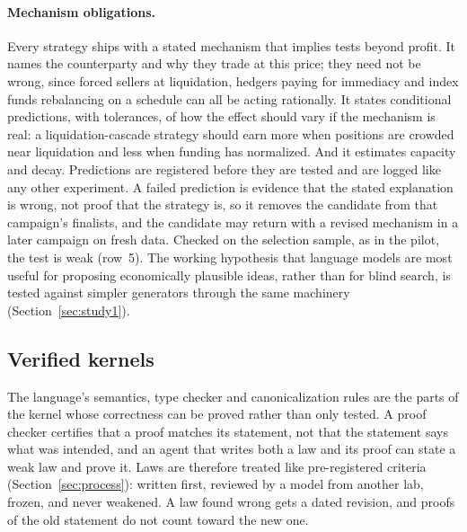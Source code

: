 \documentclass[11pt]{article}
\begin{document}
\paragraph{Mechanism obligations.} Every strategy ships with a stated mechanism that implies tests beyond profit. It names the counterparty and why they trade at this price; they need not be wrong, since forced sellers at liquidation, hedgers paying for immediacy and index funds rebalancing on a schedule can all be acting rationally. It states conditional predictions, with tolerances, of how the effect should vary if the mechanism is real: a liquidation-cascade strategy should earn more when positions are crowded near liquidation and less when funding has normalized. And it estimates capacity and decay. Predictions are registered before they are tested and are logged like any other experiment. A failed prediction is evidence that the stated explanation is wrong, not proof that the strategy is, so it removes the candidate from that campaign's finalists, and the candidate may return with a revised mechanism in a later campaign on fresh data. Checked on the selection sample, as in the pilot, the test is weak (row~5). The working hypothesis that language models are most useful for proposing economically plausible ideas, rather than for blind search, is tested against simpler generators through the same machinery (Section~\ref{sec:study1}).

\subsection{Verified kernels}\label{sec:verified}

The language's semantics, type checker and canonicalization rules are the parts of the kernel whose correctness can be proved rather than only tested. A proof checker certifies that a proof matches its statement, not that the statement says what was intended, and an agent that writes both a law and its proof can state a weak law and prove it. Laws are therefore treated like pre-registered criteria (Section~\ref{sec:process}): written first, reviewed by a model from another lab, frozen, and never weakened. A law found wrong gets a dated revision, and proofs of the old statement do not count toward the new one.
\end{document}
